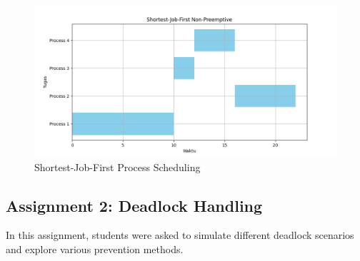 \documentclass[12pt]{article}
\begin{document}
\renewcommand{\figurename}{Gambar}
\begin{figure}[h]
    \centering
    \includegraphics[width=14cm]{./asset/GranttChart.png}
    \caption{Shortest-Job-First Process Scheduling}
\end{figure}


\subsection{Assignment 2: Deadlock Handling}
In this assignment, students were asked to simulate different deadlock
scenarios and explore various prevention methods.
\end{document}
